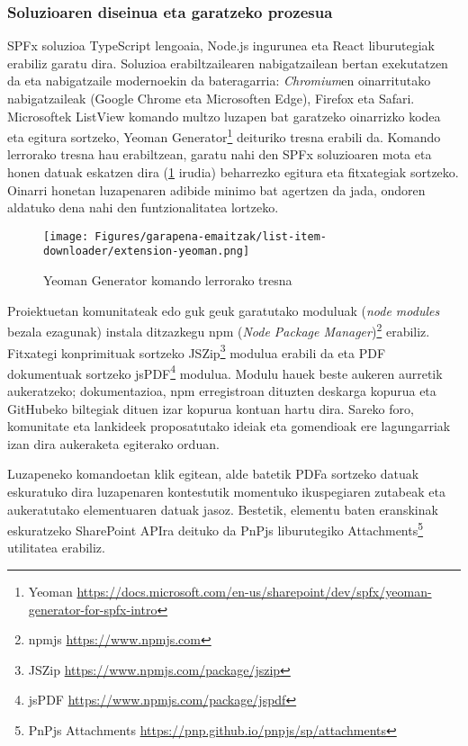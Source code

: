 \subsubsection{Soluzioaren diseinua eta garatzeko prozesua}
SPFx soluzioa TypeScript lengoaia, Node.js ingurunea eta React liburutegiak erabiliz garatu dira.
Soluzioa erabiltzailearen nabigatzailean bertan exekutatzen da eta nabigatzaile modernoekin da bateragarria: \textit{Chromium}en oinarritutako nabigatzaileak (Google Chrome eta Microsoften Edge), Firefox eta Safari. 
Microsoftek ListView komando multzo luzapen bat garatzeko oinarrizko kodea eta egitura sortzeko, Yeoman Generator\footnote{Yeoman \url{https://docs.microsoft.com/en-us/sharepoint/dev/spfx/yeoman-generator-for-spfx-intro}} deituriko tresna erabili da. Komando lerrorako tresna hau erabiltzean, garatu nahi den SPFx soluzioaren mota eta honen datuak eskatzen dira (\ref{item-download-yeoman} irudia) beharrezko egitura eta fitxategiak sortzeko. Oinarri honetan luzapenaren adibide minimo bat agertzen da jada, ondoren aldatuko dena nahi den funtzionalitatea lortzeko.

\begin{figure}[H]
\centering
\texttt{[image: Figures/garapena-emaitzak/list-item-downloader/extension-yeoman.png]}
\caption{Yeoman Generator komando lerrorako tresna}
\label{item-download-yeoman}
\end{figure}

Proiektuetan komunitateak edo guk geuk garatutako moduluak (\textit{node modules} bezala ezagunak) instala ditzazkegu npm (\textit{Node Package Manager})\footnote{npmjs \url{https://www.npmjs.com}} erabiliz. Fitxategi konprimituak sortzeko JSZip\footnote{JSZip \url{https://www.npmjs.com/package/jszip}} modulua erabili da eta PDF dokumentuak sortzeko jsPDF\footnote{jsPDF \url{https://www.npmjs.com/package/jspdf}} modulua. Modulu hauek beste aukeren aurretik aukeratzeko; dokumentazioa, npm erregistroan dituzten deskarga kopurua eta GitHubeko biltegiak dituen izar kopurua kontuan hartu dira. Sareko foro, komunitate eta lankideek proposatutako ideiak eta gomendioak ere lagungarriak izan dira aukeraketa egiterako orduan.

Luzapeneko komandoetan klik egitean, alde batetik PDFa sortzeko datuak eskuratuko dira luzapenaren kontestutik momentuko ikuspegiaren zutabeak eta aukeratutako elementuaren datuak jasoz.
Bestetik, elementu baten eranskinak eskuratzeko SharePoint APIra deituko da PnPjs liburutegiko Attachments\footnote{PnPjs Attachments \url{https://pnp.github.io/pnpjs/sp/attachments}} utilitatea erabiliz. 

